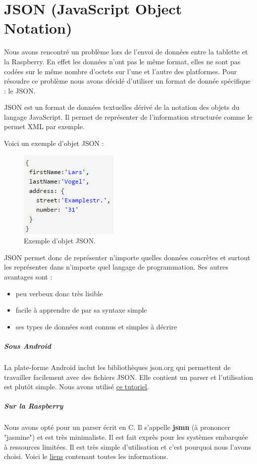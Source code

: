\documentclass[a4paper,10pt]{article}
\begin{document}
\section{JSON (JavaScript Object Notation)}

Nous avons rencontré un problème lors de l'envoi de données entre la tablette et la Raspberry. En effet les données n'ont pas le même format, elles ne sont pas codées sur le même nombre d'octets sur l'une et l'autre des platformes. Pour résoudre ce problème nous avons décidé d'utiliser un format de donnée spécifique : le JSON.

JSON est un format de données textuelles dérivé de la notation des objets du langage JavaScript. Il permet de représenter de l’information structurée comme le permet XML par exemple. 

Voici un exemple d'objet JSON :
\begin{figure}[H]
\centering\includegraphics[scale=0.7]{images/json_exemple.png}
\caption{Exemple d'objet JSON.}
\end{figure}

JSON permet donc de représenter n'importe quelles données concrètes et surtout les représenter dans n'importe quel langage de programmation. Ses autres avantages sont :
\begin{itemize}
\item peu verbeux donc très lisible
\item facile à apprendre de par sa syntaxe simple
\item ses types de données sont connus et simples à décrire
\end{itemize}

\subparagraph{Sous Android} La plate-forme Android inclut les bibliothèques json.org qui permettent de travailler facilement avec des fichiers JSON. Elle contient un parser et l'utilisation est plutôt simple. Nous avons utilisé \href{http://vogella.developpez.com/tutoriels/android/utilisation-format-json/}{ce tutoriel}.
\subparagraph{Sur la Raspberry} Nous avons opté pour un parser écrit en C. Il s'appelle \textbf{jsmn} (à prononcer "jasmine") et est très minimaliste. Il est fait exprès pour les systèmes embarquée à ressources limitées. Il est très simple d'utilisation et c'est pourquoi nous l'avons choisi. Voici le \href{http://zserge.com/jsmn.html}{liens} contenant toutes les informations.
\end{document}
